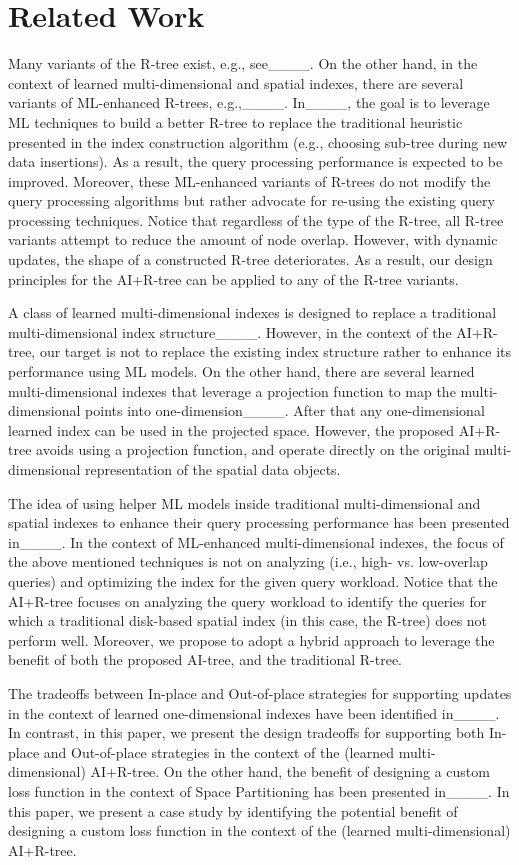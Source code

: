 \section{Related Work}
\label{section:related_work}
Many variants of the R-tree exist, e.g., see____. On the other hand, in the context of learned multi-dimensional and spatial indexes, there are several variants of ML-enhanced R-trees, e.g.,____. In____, the goal is to leverage ML techniques to build a better R-tree to replace the traditional heuristic presented in the index construction algorithm (e.g., choosing sub-tree during new data insertions).
As a result, the query processing performance is expected to be improved. Moreover, these ML-enhanced variants of R-trees do not modify the query processing algorithms 
but 
rather advocate for re-using the existing query processing techniques. Notice that regardless of the type of the R-tree, all R-tree variants attempt to reduce the amount of node overlap. However, with dynamic updates, the shape of 
a
constructed R-tree deteriorates. As a result, our design principles for the AI+R-tree can be applied to any of the R-tree variants.

A class of learned multi-dimensional indexes is designed to replace a traditional multi-dimensional index structure____. However, in the context of the AI+R-tree, our target is not to replace the existing index structure rather to enhance its performance using ML models. On the other hand, there are several learned multi-dimensional indexes that leverage a projection function to map the multi-dimensional points into one-dimension____. After that any one-dimensional learned index can be used in the projected space. However, the proposed AI+R-tree avoids using a projection function, and operate directly on the original multi-dimensional representation of the spatial data objects.

The idea of using helper ML models inside traditional multi-dimensional and spatial indexes to enhance their query processing performance 
has
been presented in____. In the context of ML-enhanced multi-dimensional indexes, the focus of the above mentioned techniques is not on analyzing (i.e., high- vs. low-overlap queries) and optimizing the index for the given query workload. Notice that the AI+R-tree focuses on analyzing the query workload to identify the queries for which a traditional disk-based spatial index (in this case, the R-tree) does not perform well. Moreover, we propose to adopt a hybrid approach to leverage the benefit of both the proposed AI-tree, and the traditional R-tree.

The tradeoffs between In-place and Out-of-place strategies for supporting updates in the context of learned one-dimensional indexes have been identified in____. In contrast, in this paper, we present the design tradeoffs for supporting both In-place and Out-of-place strategies in the context of the (learned multi-dimensional) AI+R-tree. On the other hand, the benefit of designing a custom loss function in the context of Space Partitioning has been presented in____. In this paper, we present a case study by identifying the potential benefit of designing a custom loss function in the context of the (learned multi-dimensional) AI+R-tree.